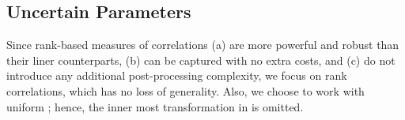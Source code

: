\subsection{Uncertain Parameters}
Since rank-based measures of correlations (a) are more powerful and robust than their liner counterparts, (b) can be captured with no extra costs, and (c) do not introduce any additional post-processing complexity, we focus on rank correlations, which has no loss of generality. Also, we choose to work with uniform \rvs; hence, the inner most transformation in  is omitted.
